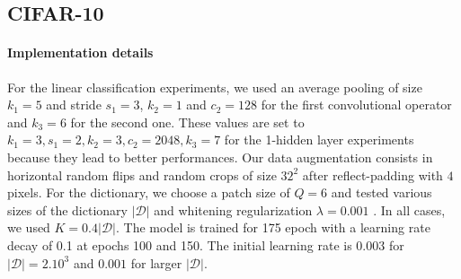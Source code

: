 \documentclass{article}
\begin{document}
\subsection{CIFAR-10}
\vspace{-0.1cm}

 \paragraph{Implementation details} For the linear classification experiments, we used an average pooling of size $k_1=5$ and stride $s_1=3$, $k_2=1$ and $c_2=128$ for the first convolutional operator and $k_3=6$ for the second one.
 These values are set to  $k_1=3, s_1=2, k_2=3,c_2=2048, k_3=7$ for the 1-hidden layer experiments because they lead to better performances.
Our data augmentation consists in horizontal random flips and random crops of size $32^2$ after reflect-padding with $4$ pixels. 
For the dictionary, we choose a patch size of $Q=6$ and tested various sizes of the dictionary $|\mathcal{D}|$ and whitening regularization $\lambda=0.001$ . 
In all cases, we used $K=0.4 |\mathcal{D}|$.%
The model is trained for 175 epoch with a learning rate  decay 
of 0.1 at epochs 100 and 150.
The initial learning rate is $0.003$ for $|\mathcal{D}|=2.10^3$
and $0.001$ for larger $|\mathcal{D}|$.
\vspace{-0.3cm}
\end{document}
